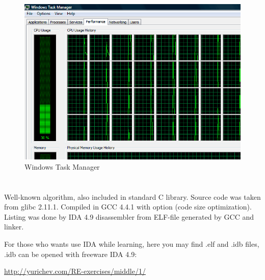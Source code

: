 \begin{figure}[H]
\centering
\includegraphics[scale=0.66]{exercises/taskmgr_64cpu_crop.png}
\caption{ Windows Task Manager}
\end{figure}

\section{}

\subsection{}

{Well-known algorithm, also included in standard C library. Source code was taken from glibc 2.11.1.
Compiled in GCC 4.4.1 with  option (code size optimization).
Listing was done by IDA 4.9 disassembler from ELF-file generated by GCC and linker.}

{For those who wants use IDA while learning, here you may find .elf and .idb files,
.idb can be opened with freeware IDA 4.9:}

\url{http://yurichev.com/RE-exercises/middle/1/}

